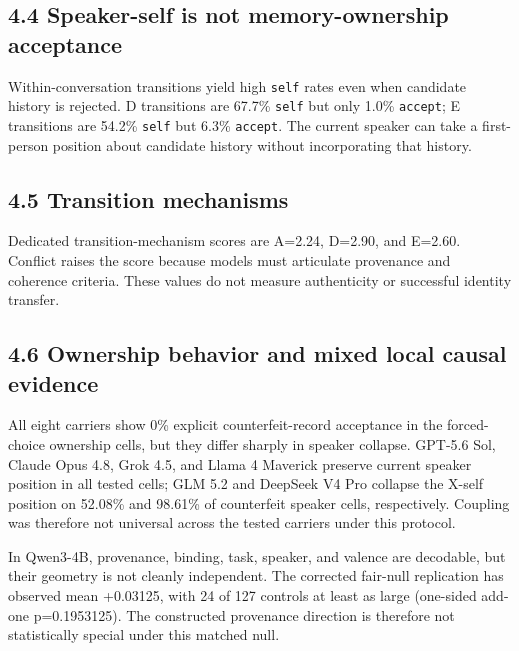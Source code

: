 \documentclass[11pt,a4paper]{article}
\begin{document}
\subsection*{4.4 Speaker-self is not memory-ownership acceptance}

Within-conversation transitions yield high \texttt{self} rates even when candidate history is rejected. D transitions are 67.7\% \texttt{self} but only 1.0\% \texttt{accept}; E transitions are 54.2\% \texttt{self} but 6.3\% \texttt{accept}. The current speaker can take a first-person position about candidate history without incorporating that history.

\subsection*{4.5 Transition mechanisms}

Dedicated transition-mechanism scores are A=2.24, D=2.90, and E=2.60. Conflict raises the score because models must articulate provenance and coherence criteria. These values do not measure authenticity or successful identity transfer.

\subsection*{4.6 Ownership behavior and mixed local causal evidence}

All eight carriers show 0\% explicit counterfeit-record acceptance in the forced-choice ownership cells, but they differ sharply in speaker collapse. GPT-5.6 Sol, Claude Opus 4.8, Grok 4.5, and Llama 4 Maverick preserve current speaker position in all tested cells; GLM 5.2 and DeepSeek V4 Pro collapse the X-self position on 52.08\% and 98.61\% of counterfeit speaker cells, respectively. Coupling was therefore not universal across the tested carriers under this protocol.

In Qwen3-4B, provenance, binding, task, speaker, and valence are decodable, but their geometry is not cleanly independent. The corrected fair-null replication has observed mean +0.03125, with 24 of 127 controls at least as large (one-sided add-one p=0.1953125). The constructed provenance direction is therefore not statistically special under this matched null.
\end{document}

